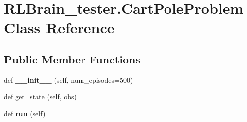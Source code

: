 \hypertarget{classRLBrain__tester_1_1CartPoleProblem}{}\section{R\+L\+Brain\+\_\+tester.\+Cart\+Pole\+Problem Class Reference}
\label{classRLBrain__tester_1_1CartPoleProblem}
\subsection*{Public Member Functions}
\begin{DoxyCompactItemize}
\item 
def {\bfseries \+\_\+\+\_\+init\+\_\+\+\_\+} (self, num\+\_\+episodes=500)\hypertarget{classRLBrain__tester_1_1CartPoleProblem_a1bca44f563fa16871b9408fb4b4ceeb2}{}\label{classRLBrain__tester_1_1CartPoleProblem_a1bca44f563fa16871b9408fb4b4ceeb2}

\item 
def \hyperlink{classRLBrain__tester_1_1CartPoleProblem_ac79a64baabd2757bfb29395b4807bdef}{get\+\_\+state} (self, obs)
\item 
def {\bfseries run} (self)\hypertarget{classRLBrain__tester_1_1CartPoleProblem_a04cc448ffac79d1a2410b1d24f2c8a7c}{}\label{classRLBrain__tester_1_1CartPoleProblem_a04cc448ffac79d1a2410b1d24f2c8a7c}

\end{DoxyCompactItemize}
